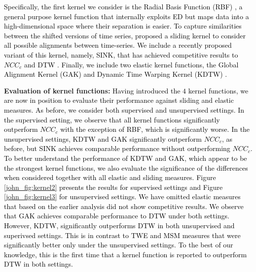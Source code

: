 \documentclass[11pt]{article}
\begin{document}
\textcolor{black}{Specifically, the first kernel we consider is the Radial Basis Function (RBF) \cite{cristianini2000introduction}, a general purpose kernel function that internally exploits ED but maps data into a high-dimensional space where their separation is easier. To capture similarities between the shifted versions of time series, \cite{wachman2009kernels} proposed a sliding kernel to consider all possible alignments between time-series. We include a recently proposed variant of this kernel, namely, SINK, that has achieved competitive results to $NCC_c$ and DTW \cite{paparrizos2019grail}. Finally, we include two elastic kernel functions, the Global Alignment Kernel (GAK) \cite{cuturi2011fast} and Dynamic Time Warping Kernel (KDTW) \cite{marteau2014recursive}.}

\noindent \textbf{Evaluation of kernel functions: } \textcolor{black}{Having introduced the $4$ kernel functions, we are now in position to evaluate their performance against sliding and elastic measures. As before, we consider both supervised and unsupervised settings. In the supervised setting, we observe that all kernel functions significantly outperform $NCC_{c}$ with the exception of RBF, which is significantly worse. In the unsupervised settings, KDTW and GAK significantly outperform $NCC_{c}$, as before, but SINK achieves comparable performance without outperforming $NCC_{c}$. To better understand the performance of KDTW and GAK, which appear to be the strongest kernel functions, we also evaluate the significance of the differences when considered together with all elastic and sliding measures. Figure \ref{john_fig:kernel2} presents the results for supervised settings and Figure \ref{john_fig:kernel3} for unsupervised settings. We have omitted elastic measures that based on the earlier analysis did not show competitive results. We observe that GAK achieves comparable performance to DTW under both settings. However, KDTW, significantly outperforms DTW in both unsupervised and superivsed settings. This is in contrast to TWE and MSM measures that were significantly better only under the unsupervised settings. To the best of our knowledge, this is the first time that a kernel function is reported to outperform DTW in both settings.}
\end{document}
